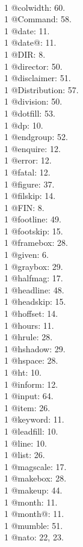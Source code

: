 \\1 @colwidth: 60.
\\1 @Command: 58.
\\1 @date: 11.
\\1 @date@: 11.
\\1 @DIR: 8.
\\1 @director: 50.
\\1 @disclaimer: 51.
\\1 @Distribution: 57.
\\1 @division: 50.
\\1 @dotfill: 53.
\\1 @dp: 10.
\\1 @endgroup: 52.
\\1 @enquire: 12.
\\1 @error: 12.
\\1 @fatal: 12.
\\1 @figure: 37.
\\1 @filskip: 14.
\\1 @FIN: 8.
\\1 @footline: 49.
\\1 @footskip: 15.
\\1 @framebox: 28.
\\1 @given: 6.
\\1 @graybox: 29.
\\1 @halfmag: 17.
\\1 @headline: 48.
\\1 @headskip: 15.
\\1 @hoffset: 14.
\\1 @hours: 11.
\\1 @hrule: 28.
\\1 @hshadow: 29.
\\1 @hspace: 28.
\\1 @ht: 10.
\\1 @inform: 12.
\\1 @input: 64.
\\1 @item: 26.
\\1 @keyword: 11.
\\1 @leadfill: 10.
\\1 @line: 10.
\\1 @list: 26.
\\1 @magscale: 17.
\\1 @makebox: 28.
\\1 @makeup: 44.
\\1 @month: 11.
\\1 @month@: 11.
\\1 @mumble: 51.
\\1 @nato: 22, 23.
